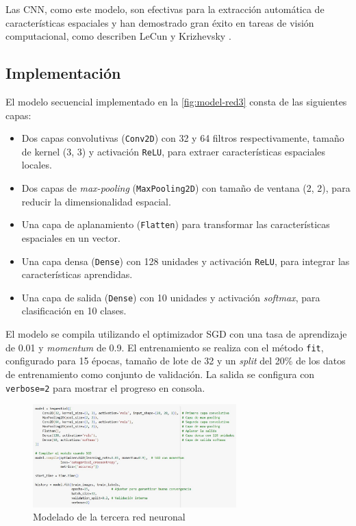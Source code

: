 Las CNN, como este modelo, son efectivas para la extracción automática de características espaciales y han demostrado gran éxito en tareas de visión computacional, como describen LeCun \parencite{lecun1998gradient} y Krizhevsky \parencite{krizhevsky2012imagenet}.

\subsection{Implementación}

El modelo secuencial implementado en la \autoref{fig:model-red3} consta de las siguientes capas:
\begin{itemize}
	\item Dos capas convolutivas (\texttt{Conv2D}) con 32 y 64 filtros respectivamente, tamaño de kernel (3, 3) y activación \texttt{ReLU}, para extraer características espaciales locales.
	\item Dos capas de \textit{max-pooling} (\texttt{MaxPooling2D}) con tamaño de ventana (2, 2), para reducir la dimensionalidad espacial.
	\item Una capa de aplanamiento (\texttt{Flatten}) para transformar las características espaciales en un vector.
	\item Una capa densa (\texttt{Dense}) con 128 unidades y activación \texttt{ReLU}, para integrar las características aprendidas.
	\item Una capa de salida (\texttt{Dense}) con 10 unidades y activación \textit{softmax}, para clasificación en 10 clases.
\end{itemize}

El modelo se compila utilizando el optimizador SGD con una tasa de aprendizaje de 0.01 y \textit{momentum} de 0.9. El entrenamiento se realiza con el método \texttt{fit}, configurado para 15 épocas, tamaño de lote de 32 y un \textit{split} del 20\% de los datos de entrenamiento como conjunto de validación. La salida se configura con \texttt{verbose=2} para mostrar el progreso en consola.

\begin{figure}[H]
	\centering
	\includegraphics[width=0.7\textwidth]{imgs/model-red3.JPG}
	\caption{Modelado de la tercera red neuronal}
	\label{fig:model-red3}
\end{figure}

